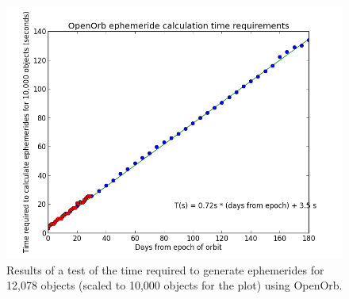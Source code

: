 \begin{figure}[h]
\begin{center}
  \includegraphics[width=6in]{illustrations/openorb_ephems.png}
\end{center}
\caption[OpenOrb ephemeris computation time requirement.]{Results of a test of the time required to generate ephemerides for 12,078 objects (scaled to 10,000 objects for the plot) using OpenOrb. }
\label{scalingEphemeris}
\end{figure}
